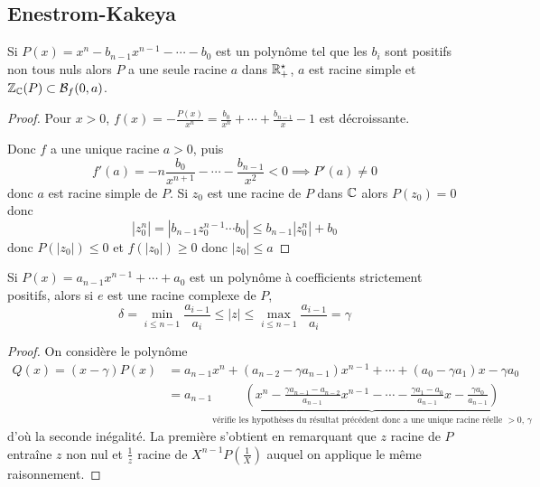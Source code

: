 \subsection{Enestrom-Kakeya}

\begin{res}[Cauchy]
    Si $P(x)=x^n-b_{n-1}x^{n-1}-\cdots -b_0$ est un polynôme tel que les $b_i$ sont positifs non tous nuls alors $P$ a une seule racine $a$ dans $\mathbb R_+^\star$, $a$ est racine simple et $\mathbb Z_{\mathbb C}(P)\subset \mathcal B_f(0, a)$.
\end{res}

\begin{proof}
    Pour $x>0$, $f(x)=-\frac{P(x)}{x^n}=\frac{b_0}{x^n}+\cdots + \frac{b_{n-1}}{x}-1$ est décroissante.

    \begin{center}
    \end{center}
    Donc $f$ a une unique racine $a>0$, puis \[
        f'(a)=-n\frac{b_0}{x^{n+1}}-\cdots-\frac{b_{n-1}}{x^2}<0 \implies P'(a)\neq 0
    \]
    donc $a$ est racine simple de $P$. Si $z_0$ est une racine de $P$ dans $\mathbb C$ alors $P(z_0)=0$ donc \[
        |z_0^n|=|b_{n-1}z_0^{n-1}\cdots b_0|\leq b_{n-1}|z_0^n|+b_0
    \]
    donc $P(|z_0|)\leq 0$ et $f(|z_0|)\geq 0$ donc $|z_0|\leq a$
\end{proof}

\begin{res}
    Si $P(x)=a_{n-1}x^{n-1}+\cdots +a_0$ est un polynôme à coefficients strictement positifs, alors si $e$ est une racine complexe de $P$, \[
        \delta=\min_{i\leq n-1}\frac{a_{i-1}}{a_i} \leq |z|\leq \max_{i\leq n-1}\frac{a_{i-1}}{a_i}=\gamma
    \]
\end{res}

\begin{proof}
    On considère le polynôme \begin{align*}
        Q(x)=(x-\gamma)P(x)&=a_{n-1}x^{n}+(a_{n-2}-\gamma a_{n-1})x^{n-1}+\cdots +(a_0-\gamma a_1)x -\gamma a_0\\ &= a_{n-1}\underbrace{\left(x^n-\frac{\gamma a_{n-1}-a_{n-2}}{a_{n-1}}x^{n-1} -\cdots -\frac{\gamma a_1-a_0}{a_{n-1}}x-\frac{\gamma a_0}{a_{n-1}}\right)}_{\text{vérifie les hypothèses du résultat précédent donc a une unique racine réelle $>0$, $\gamma$}}
    \end{align*}
    d'où la seconde inégalité. La première s'obtient en remarquant que $z$ racine de $P$ entraîne $z$ non nul et $\frac 1z$ racine de $X^{n-1}P\left(\frac1X\right)$ auquel on applique le même raisonnement.
\end{proof}

